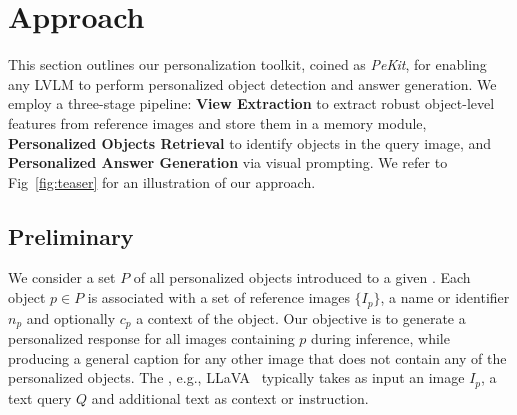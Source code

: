 \section{Approach}
\vspace{-0.2cm}
\label{sec:approach}
 This section outlines our personalization toolkit, coined as \textit{PeKit}, for enabling any LVLM to perform personalized object detection and answer generation. We employ a three-stage pipeline: \textbf{View Extraction} to extract robust object-level features from reference images and store them in a memory module, \textbf{Personalized Objects Retrieval} to identify objects in the query image, and \textbf{Personalized Answer Generation} via visual prompting. We refer to Fig~\ref{fig:teaser} for an illustration of our approach.
\vspace{-0.1cm}
\subsection{Preliminary}
\vspace{-0.1cm}
We consider a set $P$ of all personalized objects introduced to a given \VLM. Each object $p\in P$ is associated with a set of reference images $\{I_p\}$, a name or identifier $n_p$ and optionally $c_p$ a context of the object.
Our objective is to generate a personalized response for all images containing $p$ during inference, while producing a general caption for any other image that does not contain any of the personalized objects.
The \VLM, e.g., LLaVA~\cite{liu2024visual} typically takes as input an image $I_p$, a text query $Q$ and additional text as context or instruction.
\vspace{-0.1cm}
